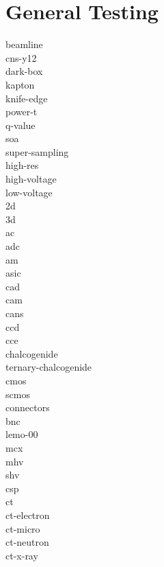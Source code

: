 \documentclass[../main.tex]{subfiles}%
\begin{document}
%
\chapter{General Testing}%
\gls{beamline}\\%
\gls{cns-y12}\\%
\gls{dark-box}\\%
\gls{kapton}\\%
\gls{knife-edge}\\%
\gls{power-t}\\%
\gls{q-value}\\%
\gls{soa}\\%
\gls{super-sampling}\\%
\gls{high-res}\\%
\gls{high-voltage}\\%
\gls{low-voltage}\\%
\gls{2d}\\%
\gls{3d}\\%
\gls{ac}\\%
\gls{adc}\\%
\gls{am}\\%
\gls{asic}\\%
\gls{cad}\\%
\gls{cam}\\%
\gls{cans}\\%
\gls{ccd}\\%
\gls{cce}\\%
\gls{chalcogenide}\\%
\gls{ternary-chalcogenide}\\%
\gls{cmos}\\%
\gls{scmos}\\%
\gls{connectors}\\%
\gls{bnc}\\%
\gls{lemo-00}\\%
\gls{mcx}\\%
\gls{mhv}\\%
\gls{shv}\\%
\gls{csp}\\%
\gls{ct}\\%
\gls{ct-electron}\\%
\gls{ct-micro}\\%
\gls{ct-neutron}\\%
\gls{ct-x-ray}\\%
\end{document}
